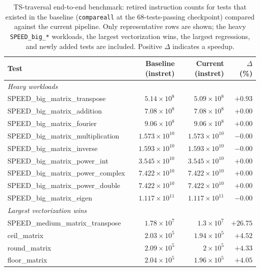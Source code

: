 \begin{table}[H]
\centering
\caption{TS-traversal end-to-end benchmark: retired instruction counts for tests that existed in the baseline (\texttt{compareall} at the 68-tests-passing checkpoint) compared against the current pipeline. Only representative rows are shown; the heavy \texttt{SPEED\_big\_*} workloads, the largest vectorization wins, the largest regressions, and newly added tests are included. Positive $\Delta$ indicates a speedup.}
\label{tab:ts-timediff}
\small
\begin{tabular}{l r r r}
\toprule
Test & Baseline (instret) & Current (instret) & $\Delta$ (\%) \\
\midrule
\multicolumn{4}{l}{\emph{Heavy workloads}} \\
SPEED\_big\_matrix\_transpose  & $5.14 \times 10^{8}$   & $5.09 \times 10^{8}$   & $+0.93$ \\
SPEED\_big\_matrix\_addition   & $7.08 \times 10^{8}$   & $7.08 \times 10^{8}$   & $+0.00$ \\
SPEED\_big\_matrix\_fourier    & $9.06 \times 10^{8}$   & $9.06 \times 10^{8}$   & $+0.00$ \\
SPEED\_big\_matrix\_multiplication & $1.573 \times 10^{10}$ & $1.573 \times 10^{10}$ & $-0.00$ \\
SPEED\_big\_matrix\_inverse    & $1.593 \times 10^{10}$ & $1.593 \times 10^{10}$ & $-0.00$ \\
SPEED\_big\_matrix\_power\_int & $3.545 \times 10^{10}$ & $3.545 \times 10^{10}$ & $+0.00$ \\
SPEED\_big\_matrix\_power\_complex & $7.422 \times 10^{10}$ & $7.422 \times 10^{10}$ & $+0.00$ \\
SPEED\_big\_matrix\_power\_double & $7.422 \times 10^{10}$ & $7.422 \times 10^{10}$ & $+0.00$ \\
SPEED\_big\_matrix\_eigen      & $1.117 \times 10^{11}$ & $1.117 \times 10^{11}$ & $-0.00$ \\
\midrule
\multicolumn{4}{l}{\emph{Largest vectorization wins}} \\
SPEED\_medium\_matrix\_transpose & $1.78 \times 10^{7}$   & $1.3 \times 10^{7}$    & $+26.75$ \\
ceil\_matrix                   & $2.03 \times 10^{5}$   & $1.94 \times 10^{5}$   & $+4.52$ \\
round\_matrix                  & $2.09 \times 10^{5}$   & $2 \times 10^{5}$      & $+4.33$ \\
floor\_matrix                  & $2.04 \times 10^{5}$   & $1.96 \times 10^{5}$   & $+4.05$ \\

\end{tabular}
\end{table}
